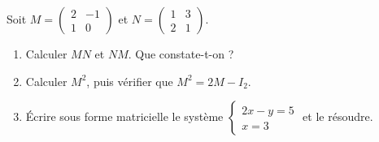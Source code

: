 \documentclass[11pt]{article}
\begin{document}
\begin{exercice}
Soit $M = \begin{pmatrix} 2 & -1 \\ 1 & 0 \end{pmatrix}$ et $N = \begin{pmatrix} 1 & 3 \\ 2 & 1 \end{pmatrix}$.
\begin{enumerate}
\item Calculer $MN$ et $NM$. Que constate-t-on ?
\item Calculer $M^2$, puis vérifier que $M^2 = 2M - I_2$.
\item Écrire sous forme matricielle le système $\begin{cases} 2x - y = 5 \\ x = 3 \end{cases}$ et le résoudre.
\end{enumerate}
\end{exercice}
\end{document}
